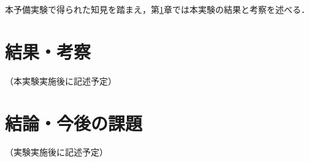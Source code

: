 \documentclass{ltjsarticle}
\begin{document}
本予備実験で得られた知見を踏まえ，第\ref{sec5}章では本実験の結果と考察を述べる．

\newpage

\section{結果・考察}\label{sec5}

（本実験実施後に記述予定）

\newpage

\section{結論・今後の課題}\label{sec6}

（実験実施後に記述予定）

\newpage

\nocite{*}


\end{document}
